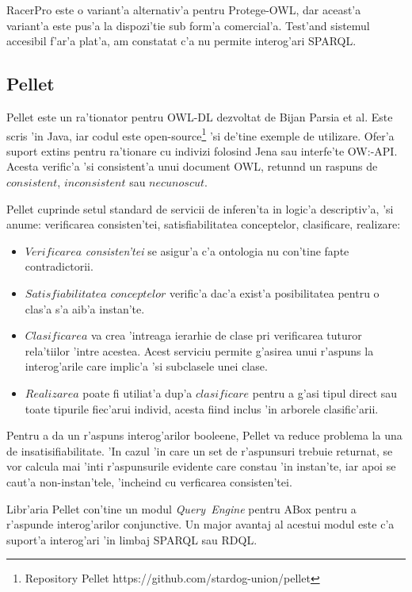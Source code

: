 \documentclass[12pt,a4paper,twoside]{report}
\begin{document}
RacerPro este o variant'a alternativ'a pentru Protege-OWL, dar aceast'a variant'a este pus'a la dispozi'tie sub form'a comercial'a. Test'and sistemul accesibil f'ar'a plat'a, am constatat c'a nu permite interog'ari SPARQL.



\subsection{Pellet}
\label{sec:pellet}

Pellet \cite{SirinPellet:Reasoner} este un ra'tionator pentru OWL-DL dezvoltat de Bijan Parsia et al. Este scris 'in Java, iar codul este open-source\footnote{Repository Pellet https://github.com/stardog-union/pellet} 'si de'tine exemple de utilizare. Ofer'a suport extins pentru ra'tionare cu indivizi folosind Jena sau interfe'te OW:-API. Acesta verific'a 'si consistent'a unui document OWL, retun\ia nd un raspuns de $consistent$, $inconsistent$ sau $necunoscut$.

Pellet cuprinde setul standard de servicii de inferen'ta in logic'a descriptiv'a, 'si anume: verificarea consisten'tei, satisfiabilitatea conceptelor, clasificare, realizare:
\begin{itemize}
    \item $Verificarea$ {\it consisten'tei} se asigur'a c'a ontologia nu con'tine fapte contradictorii.
    \item $Satisfiabilitatea$ $conceptelor$ verific'a dac'a exist'a posibilitatea pentru o clas'a s'a aib'a instan'te.
    \item $Clasificarea$ va crea 'intreaga ierarhie de clase pri verificarea tuturor rela'tiilor 'intre acestea. Acest serviciu permite g'asirea unui r'aspuns la interog'arile care implic'a 'si subclasele unei clase.
    \item $Realizarea$ poate fi utiliat'a dup'a $clasificare$ pentru a g'asi tipul direct sau toate tipurile fiec'arui individ, acesta fiind inclus 'in arborele clasific'arii.
\end{itemize}
   

Pentru a da un r'aspuns interog'arilor booleene, Pellet va reduce problema la una de insatisifiabilitate. 'In cazul 'in care un set de r'aspunsuri trebuie returnat, se vor calcula mai 'int\ia i r'aspunsurile evidente care constau 'in instan'te, iar apoi se caut'a non-instan'tele, 'incheind cu verficarea consisten'tei. 

Libr'aria Pellet con'tine un modul {\it Query\ Engine} pentru ABox pentru a r'aspunde interog'arilor conjunctive. Un major avantaj al acestui modul este c'a suport'a interog'ari 'in limbaj SPARQL sau RDQL.
\end{document}
